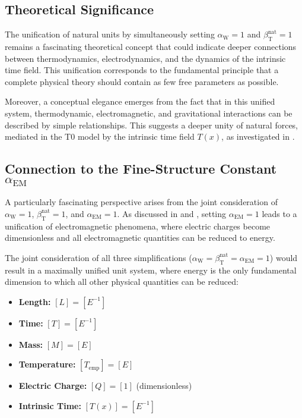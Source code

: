\documentclass[12pt,a4paper]{article}
\newcommand{\Tfield}{T(x)}
\newcommand{\betaT}{\beta_{\text{T}}}
\newcommand{\alphaEM}{\alpha_{\text{EM}}}
\newcommand{\alphaW}{\alpha_{\text{W}}}
\begin{document}
	\subsection{Theoretical Significance}
	\label{subsec:theoretical_significance}
	
	The unification of natural units by simultaneously setting \(\alphaW = 1\) and \(\betaT^{\text{nat}} = 1\) remains a fascinating theoretical concept that could indicate deeper connections between thermodynamics, electrodynamics, and the dynamics of the intrinsic time field. This unification corresponds to the fundamental principle that a complete physical theory should contain as few free parameters as possible.
	
	Moreover, a conceptual elegance emerges from the fact that in this unified system, thermodynamic, electromagnetic, and gravitational interactions can be described by simple relationships. This suggests a deeper unity of natural forces, mediated in the T0 model by the intrinsic time field \(\Tfield\), as investigated in \cite{pascher_grundkraefte_2025}.
	
	\subsection{Connection to the Fine-Structure Constant \(\alphaEM\)}
	\label{subsec:connection_alpha_em}
	
	A particularly fascinating perspective arises from the joint consideration of \(\alphaW = 1\), \(\betaT^{\text{nat}} = 1\), and \(\alphaEM = 1\). As discussed in \cite{pascher_alpha_2025} and \cite{pascher_alphabeta_2025}, setting \(\alphaEM = 1\) leads to a unification of electromagnetic phenomena, where electric charges become dimensionless and all electromagnetic quantities can be reduced to energy.
	
	The joint consideration of all three simplifications (\(\alphaW = \betaT^{\text{nat}} = \alphaEM = 1\)) would result in a maximally unified unit system, where energy is the only fundamental dimension to which all other physical quantities can be reduced:
	
	\begin{tcolorbox}[colback=blue!5!white,colframe=blue!75!black,title=Fully Unified Unit System]
		\begin{itemize}
			\item \textbf{Length:} \([L] = [E^{-1}]\)
			\item \textbf{Time:} \([T] = [E^{-1}]\)
			\item \textbf{Mass:} \([M] = [E]\)
			\item \textbf{Temperature:} \([T_{\text{emp}}] = [E]\)
			\item \textbf{Electric Charge:} \([Q] = [1]\) (dimensionless)
			\item \textbf{Intrinsic Time:} \([\Tfield] = [E^{-1}]\)
		\end{itemize}
	\end{tcolorbox}
	
\end{document}
